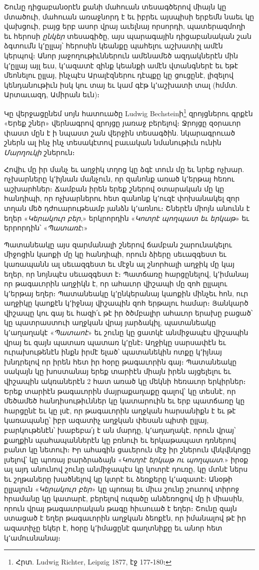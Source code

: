 \documentclass{article}
\begin{document}
{Շունը դիցաբանօրէն քանի մահուան տեսագծերով միայն կը մտածուի, մահուան առաջնորդ է եւ իբրեւ այսպիսի երբեմն նաեւ կը վախցուի, բայց երբ ասոր վրայ աւելնայ որսորդի, պատերազմողի եւ հերոսի \emph{ընկեր} տեսագիծը, այս պարագային դիցաբանական շան ձգտումն կ՚ըլլայ՝ հերոսին կեանքը պահելու աշխատիլ ամէն կերպով։ Անոր յաջողութիւններուն ամենամեծ ազդակներէն մին կ՚ըլլայ այլ եւս, կ՚ազատէ զինք կեանքի ամէն վտանգներէ եւ եթէ մեոնելու ըլլայ, ինչպէս Արալէզներու դէպքը կը ցուցընէ, լիզելով կենդանութիւն իսկ կու տայ եւ կամ գէթ կ՚աշխատի տալ (հմմտ. Արտաւազդ, Ամիրան եւն)։

Կը վերջացընեմ սոյն հատուածը Ludwig Bechsteinի\footnote{Հրտ. Ludwig Richter, Leipzig 1877, էջ 177֊180։} զրոյցներու գրքէն «Երեք շներ» վերնագրով զրոյցը յառաջ բերելով։ Ջրոյցը զօրաւոր փաստ մըն է ի նպաստ շան վերջին տեսագծին. նկարագրուած շներն ալ ինչ ինչ տեսակէտով բաւական նմանութիւն ունին \emph{Մարղուկի} շներուն։

Հովիւ մը իր մանչ եւ աղջիկ տղոց կը ձգէ տուն մը եւ նրեք ոչխար. ոչխարները կ՚իյնան մանչուն, որ զանոնք առած կ՚երթայ հեռու աշխարհներ։ Ճամբան իրեն երեք շներով օտարական մը կը հանդիպի, որ ոչխարներու հետ զանոնք կ՚ուզէ փոխանակել զոր տղան մեծ դժուարութեամբ յանձն կ՚առնու։ Շներէն միոյն անունն է եղեր «\emph{Կերակուր բեր},» երկրորդին «\emph{Կոտրէ պողպատ եւ երկաթ}» եւ երրորդին՝ «\emph{Պատառէ}։»

Պատանեակը այս զարմանալի շներով ճամբան շարունակելու միջոցին կաոքի մը կը հանդիպի, որուն ձիերը սեւազգեստ եւ կառապանն ալ սեւազգեստ եւ մէջն ալ շնորհալի աղջիկ մը կայ եղեր, որ նոյնպէս սեւազգեստ է։ Պատճառը հարցընելով, կ՚իմանայ որ թագաւորին աղջիկն է, որ ահաւոր վիշապի մը զոհ ըլլալու կ՚երթայ եղեր։ Պատանեակը կ՚ընկերանայ կաոքին մինչեւ հոն, ուր աղջիկը կաոքէն կ՚իջնայ վիշապին զոհ երթալու համար։ Յանկարծ վիշապը կու գայ եւ հազի՛ւ թէ իր ծծմբալիր ահաւոր երախը բացած՝ կը պատրաստուի աղջկան վրայ յարձակիլ, պատանեակը կ՚աղաղակէ «\emph{Պատաոէ}» եւ շունը կը ցատկէ անմիջապէս վիշապին վրայ եւ զայն պատառ պատառ կ՚ընէ։ Աղջիկը սարսափէն եւ ուրախութենէն ինքն իրմէ ելած՝ պատանեկին ոտքը կ՚իյնայ խնդրելով որ իրեն հետ իր հօրը թագաւորին գայ։ Պատանեակը սակայն կը խոստանայ երեք տարիէն միայն իրեն այցելելու եւ վիշապին ակռաներէն 2 հատ առած կը մեկնի հեռաւոր երկիրներ։ Երեք տարիէն թագաւորին մայրաքաղաքը գալով՝ կը տեսնէ, որ մեծամեծ հանդիսութիւններ կը կատարուին եւ երբ պատճառը կը հարցընէ եւ կը լսէ, որ թագաւորին աղջկան հարսանիքն է եւ թէ կառապանը՝ իբր ազատիչ աղջկան փեսան պիտի ըլլայ, բարկութենէն՝ խաբեբա՛յ է ան մարդը, կ՚աղաղակէ, որուն վրայ՝ քաղքին պահապաններէն կը բռնուի եւ երկաթապատ դռներով բանտ կը նետուի։ Իր ահագին ցաւերուն մէջ իր շներուն վնկվնկոցը լսելով՝ կը պոռայ բարձրաձայն «\emph{Կոտրէ երկաթ ու պողպատ}.» իրօք ալ այդ անունով շունը անմիջապէս կը կոտրէ դուռը, կը մտնէ ներս եւ շղթաները խածնելով կը կտրէ եւ ձեռքերը կ՚ազատէ։ Անօթի ըլլալուն «\emph{Կերակուր բեր}» կը պոռայ եւ միւս շունը շուտով տիրոջ հրամանը կը կատարէ, բերելով ուզածը անձեռոցով մը ի միասին, որուն վրայ թագաւորական թագը հիւսուած է եղեր։ Շունը զայն ստացած է եղեր թագաւորին աղջկան ձեոքէն, որ իմանալով թէ իր ազատիչը եկեր է, հօրը կ՚իմացընէ գաղտնիքը եւ անոր հետ կ՚ամուսնանայ։

}
\end{document}
